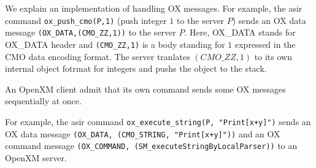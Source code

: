 We explain an implementation of handling OX messages.
For example, the asir command {\tt ox\_push\_cmo(P,1)}
(push integer $1$ to the server $P$)
sends an OX data message
{\tt (OX\_DATA,(CMO\_ZZ,1))} to the server $P$.
Here,
OX\_DATA stands for OX\_DATA header and 
{\tt (CMO\_ZZ,1)} is a body standing for $1$ expressed 
in the CMO data encoding format.
The server tranlates $(CMO\_ZZ, 1)$ to its own internal object fotrmat
for integers and pushs the object to the stack.

An OpenXM client admit that its own command sends some OX messages
sequentially at once.  

For example, the asir command
{\tt ox\_execute\_string(P, "Print[x+y]")} sends an OX data message
{\tt (OX\_DATA, (CMO\_STRING, "Print[x+y]"))} and an OX command message
{\tt (OX\_COMMAND, (SM\_executeStringByLocalParser))} to an OpenXM
server.